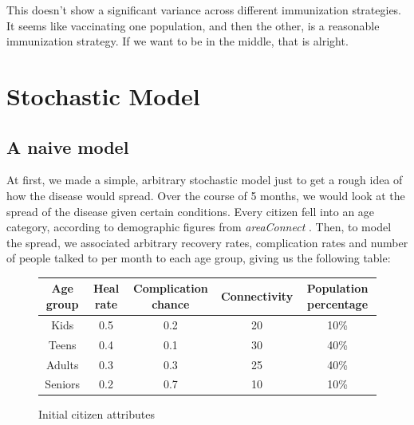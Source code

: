 \documentclass{article}
\begin{document}
This doesn't show a significant variance across different immunization strategies.
It seems like vaccinating one population, and then the other, is a reasonable
	immunization strategy.
If we want to be in the middle, that is alright.

\section{Stochastic Model}
\subsection{A naive model}
\par At first, we made a simple, arbitrary stochastic model just to get a rough idea of how the disease would spread. Over the course of 5 months, we would look at the spread of the disease given certain conditions. Every citizen fell into an age category, according to demographic figures from \emph{areaConnect} \cite{areconnect}. Then, to model the spread, we associated arbitrary recovery rates, complication rates and number of people talked to per month to each age group, giving us the following table:
\begin{figure}[h!]
\centering
\begin{tabular}{c|c|c|c|c}
Age group & Heal rate & Complication chance & Connectivity & Population percentage\\ \hline
Kids & 0.5 & 0.2 & 20 & 10\%\\
Teens & 0.4 & 0.1 & 30 & 40\%\\
Adults & 0.3 & 0.3 & 25 & 40\%\\
Seniors & 0.2 & 0.7 & 10 & 10\%
\end{tabular}
\caption{Initial citizen attributes}
\end{figure}
\end{document}
